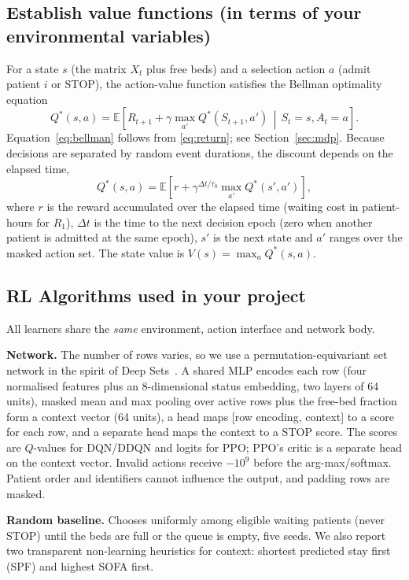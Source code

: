 \documentclass{rlreport}
\begin{document}
\subsection{Establish value functions (in terms of your environmental variables)}
For a state $s$ (the matrix $X_t$ plus free beds) and a selection action $a$ (admit patient $i$ or STOP), the action-value function satisfies the Bellman optimality equation
\begin{equation}
  Q^{*}(s,a) = \mathbb{E}\!\left[ R_{t+1} + \gamma \max_{a'} Q^{*}(S_{t+1}, a') \,\middle|\, S_t = s, A_t = a \right].
  \label{eq:bellman}
\end{equation}
Equation~\eqref{eq:bellman} follows from \eqref{eq:return}; see Section~\ref{sec:mdp}. Because decisions are separated by random event durations, the discount depends on the elapsed time,
\begin{equation}
  Q^*(s,a)=\mathbb E\!\left[r+\gamma^{\Delta t/\tau_0}\max_{a'}Q^*(s',a')\right],
  \label{eq:smdpq}
\end{equation}
where $r$ is the reward accumulated over the elapsed time (waiting cost in patient-hours for $R_1$), $\Delta t$ is the time to the next decision epoch (zero when another patient is admitted at the same epoch), $s'$ is the next state and $a'$ ranges over the masked action set. The state value is $V(s)=\max_aQ^*(s,a)$.

\subsection{RL Algorithms used in your project}
All learners share the \emph{same} environment, action interface and network body.

\textbf{Network.} The number of rows varies, so we use a permutation-equivariant set network in the spirit of Deep Sets~\cite{zaheer2017deepsets}. A shared MLP encodes each row (four normalised features plus an 8-dimensional status embedding, two layers of 64 units), masked mean and max pooling over active rows plus the free-bed fraction form a context vector (64 units), a head maps [row encoding, context] to a score for each row, and a separate head maps the context to a STOP score. The scores are $Q$-values for DQN/DDQN and logits for PPO; PPO's critic is a separate head on the context vector. Invalid actions receive $-10^{9}$ before the arg-max/softmax. Patient order and identifiers cannot influence the output, and padding rows are masked.

\textbf{Random baseline.} Chooses uniformly among eligible waiting patients (never STOP) until the beds are full or the queue is empty, five seeds. We also report two transparent non-learning heuristics for context: shortest predicted stay first (SPF) and highest SOFA first.
\end{document}
